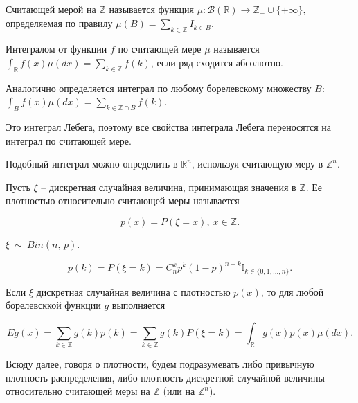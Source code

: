 \begin{definition}
Считающей мерой на $\displaystyle \mathbb{Z}$ называется функция $\displaystyle \mu :\mathcal{B}(\mathbb{R})\rightarrow \mathbb{Z}_{+} \cup \{+\infty \}$, определяемая по правилу $\displaystyle \mu ( B) =\sum _{k\in \mathbb{Z}} I_{k\in B}$.
\end{definition}

\begin{definition}
Интегралом от функции $\displaystyle f$ по считающей мере $\displaystyle \mu $ называется $\displaystyle \int _{\mathbb{R}} f( x) \mu ( dx) =\sum _{k\in \mathbb{Z}} f( k)$, если ряд сходится абсолютно.
\end{definition}

Аналогично определяется интеграл по любому борелевскому множеству $\displaystyle B$: $\displaystyle \int _{B} f( x) \mu ( dx) =\sum _{k\in \mathbb{Z} \cap B} f( k)$.
\begin{note}

Это интеграл Лебега, поэтому все свойства интеграла Лебега переносятся на интеграл по считающей мере.
\end{note}

\begin{note}
Подобный интеграл можно определить в $\displaystyle \mathbb{R}^{n}$, используя считающую меру в $\displaystyle \mathbb{Z}^{n}$.
\end{note}

\begin{definition}
Пусть $\displaystyle \xi $ -- дискретная случайная величина, принимающая значения в $\displaystyle \mathbb{Z}$. Ее плотностью относительно считающей меры называется

\begin{equation*}
p( x) =P( \xi =x) ,\ x\in \mathbb{Z} .
\end{equation*}
\end{definition}
\begin{example}
$\displaystyle \xi \ \sim \ Bin(n,\, p)$.


\begin{equation*}
p( k) =P( \xi =k) =C_{n}^{k} p^{k}( 1-p)^{n-k}\mathbb{I}_{k\in \{0,1,\dotsc ,n\}} .
\end{equation*}
\end{example}
Если $\displaystyle \xi $ дискретная случайная величина с плотностью $\displaystyle p( x)$, то для любой борелевсккой функции $\displaystyle g$ выполняется


\begin{equation*}
Eg( x) =\sum _{k\in \mathbb{Z}} g( k) p( k) =\sum _{k\in \mathbb{Z}} g( k) P( \xi =k) =\int _{\mathbb{R}} g( x) p( x) \mu ( dx) .
\end{equation*}
\begin{note}
Всюду далее, говоря о плотности, будем подразумевать либо привычную плотность распределения, либо плотность дискретной случайной величины относительно считающей меры на $\displaystyle \mathbb{Z}$ (или на $\displaystyle \mathbb{Z}^{n}$).
\end{note}

